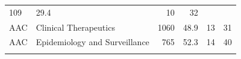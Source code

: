 \documentclass[11pt,]{article}
\begin{document}
\begin{longtable}[]{@{}llrrrr@{}}
\begin{minipage}[t]{0.04\columnwidth}
109\strut
\end{minipage} & \begin{minipage}[t]{0.08\columnwidth}\raggedleft\strut
29.4\strut
\end{minipage} & \begin{minipage}[t]{0.11\columnwidth}\raggedleft\strut
10\strut
\end{minipage} & \begin{minipage}[t]{0.11\columnwidth}\raggedleft\strut
32\strut
\end{minipage}\tabularnewline
\begin{minipage}[t]{0.06\columnwidth}\raggedright\strut
AAC\strut
\end{minipage} & \begin{minipage}[t]{0.43\columnwidth}\raggedright\strut
Clinical Therapeutics\strut
\end{minipage} & \begin{minipage}[t]{0.04\columnwidth}\raggedleft\strut
1060\strut
\end{minipage} & \begin{minipage}[t]{0.08\columnwidth}\raggedleft\strut
48.9\strut
\end{minipage} & \begin{minipage}[t]{0.11\columnwidth}\raggedleft\strut
13\strut
\end{minipage} & \begin{minipage}[t]{0.11\columnwidth}\raggedleft\strut
31\strut
\end{minipage}\tabularnewline
\begin{minipage}[t]{0.06\columnwidth}\raggedright\strut
AAC\strut
\end{minipage} & \begin{minipage}[t]{0.43\columnwidth}\raggedright\strut
Epidemiology and Surveillance\strut
\end{minipage} & \begin{minipage}[t]{0.04\columnwidth}\raggedleft\strut
765\strut
\end{minipage} & \begin{minipage}[t]{0.08\columnwidth}\raggedleft\strut
52.3\strut
\end{minipage} & \begin{minipage}[t]{0.11\columnwidth}\raggedleft\strut
14\strut
\end{minipage} & \begin{minipage}[t]{0.11\columnwidth}\raggedleft\strut
40\strut
\end{minipage}\tabularnewline
\begin{minipage}[t]{0.06\columnwidth}\raggedright\strut

\end{minipage}
\end{longtable}
\end{document}

